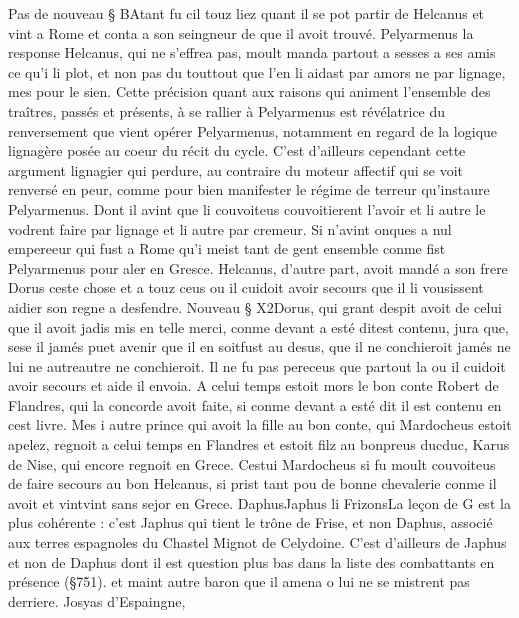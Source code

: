 \documentclass{article}
\begin{document}
\begin{pages}
\pstart Pas de nouveau § BAtant fu cil touz liez 
   quant il se pot partir de Helcanus 
   et vint a Rome et conta a son seingneur 
   de que il avoit trouvé. Pelyarmenus
   la response Helcanus, qui ne s’effrea pas, moult manda partout a 
   sesses a ses amis ce qu’i li plot, et non pas du 
   touttout que l'en li aidast par amors ne par lignage, mes pour le sien.
   Cette précision quant aux raisons qui animent l'ensemble des traîtres, passés et présents, à se rallier 
   à Pelyarmenus est révélatrice du renversement que vient opérer Pelyarmenus, notamment en regard de la logique lignagère posée 
   au coeur du récit du cycle. C'est d'ailleurs cependant cette argument lignagier qui perdure, au contraire du moteur affectif 
   qui se voit renversé en peur, comme pour bien manifester le régime de terreur qu'instaure Pelyarmenus.
   Dont il avint que li couvoiteus couvoitierent l’avoir et li autre le vodrent faire par lignage et li autre par cremeur. 
   Si n’avint onques a nul empereeur qui fust a Rome qu’i meist tant de gent ensemble 
   conme fist Pelyarmenus pour aler en Gresce. \pend
\pstart Helcanus, d’autre part, avoit mandé a son frere 
   Dorus ceste chose et a touz ceus ou il cuidoit avoir secours que il li vousissent aidier son regne 
   a desfendre. Nouveau § X2Dorus, qui grant despit avoit de celui 
   que il avoit jadis mis en telle merci, conme devant 
      a esté ditest contenu, jura que, sese il jamés 
   puet avenir que il en soitfust au desus, que il ne conchieroit jamés ne lui ne 
   autreautre ne conchieroit. Il ne fu pas pereceus 
   que partout la ou il cuidoit avoir secours et aide 
   il envoia. 
   A celui temps estoit mors le bon conte Robert de Flandres, 
   qui la concorde avoit faite, si conme devant a esté dit
      il est contenu en cest livre. Mes i autre prince qui avoit 
   la fille au bon conte, qui Mardocheus estoit apelez, 
   regnoit a celui temps en Flandres et estoit filz au 
   bonpreus 
      ducduc, Karus de Nise, 
   qui encore regnoit en Grece. Cestui Mardocheus 
   si fu moult couvoiteus de faire secours au bon Helcanus, si prist tant pou de bonne chevalerie 
   conme il avoit et vintvint sans sejor en Grece. \pend
\pstart DaphusJaphus 
   li FrizonsLa leçon de G est la plus cohérente : 
   c'est Japhus qui tient le trône de Frise, et non Daphus, associé aux terres espagnoles du Chastel Mignot de Celydoine.
   C'est d'ailleurs de Japhus et non de Daphus dont il est question plus bas dans la liste des combattants en présence (§751). 
   et maint autre baron que il amena o lui 
   ne se mistrent pas derriere. Josyas d’Espaingne, 

\end{pages}
\end{document}
